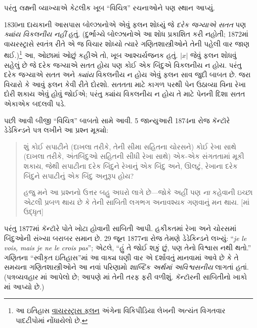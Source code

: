 \documentclass[../../../include/open-logic-section]{subfiles}
\begin{document}

પરંતુ \emph{લક્ષ}ની વ્યાખ્યાએ કેટલીક ખૂબ
“વિચિત્ર” રચનાઓને પણ સ્થાન આપ્યું.

1830ના દાયકાની આસપાસ બોલ્ઝાનોએ એવું
ફલન શોધ્યું જે \emph{દરેક જગ્યાએ સતત}
પણ \emph{ક્યાંય વિકલનીય નહીં} હતું.
(દુર્ભાગ્યે બોલ્ઝાનોએ આ શોધ પ્રકાશિત
કરી નહોતી; 1872માં વાયરસ્ટ્રાસે સ્વતંત્ર
રીતે એ જ વિચાર શોધ્યો ત્યારે ગણિતશાસ્ત્રીઓને
તેની પહેલી વાર જાણ થઈ.)\footnote{આ ઇતિહાસ
\href{http://en.wikipedia.org/wiki/Weierstrass_function}{વાયરસ્ટ્રાસ
ફલન} અંગેના વિકિપીડિયા લેખની અત્યંત
વિગતવાર પાદટીપોમાં નોંધાયેલો છે.}
આ, ઓછામાં ઓછું કહીએ તો, ખૂબ આશ્ચર્યજનક
હતું. $|x|$ જેવું ફલન શોધવું સહેલું છે
જે દરેક જગ્યાએ સતત હોય પણ કોઈ એક
બિંદુએ વિકલનીય ન હોય. પરંતુ દરેક
જગ્યાએ સતત અને \emph{ક્યાંય}
વિકલનીય ન હોય એવું ફલન સાવ
જુદી બાબત છે. જરા વિચારો કે
આવું ફલન કેવી રીતે દોરશો.
સતતતા માટે કાગળ પરથી પેન
ઉઠાવ્યા વિના રેખા દોરી શકાય
એવું હોવું જોઈએ; પરંતુ ક્યાંય
વિકલનીય ન હોય તે માટે પેનની
દિશા સતત એકાએક બદલવી પડે.

પછી આવી બીજી “વિચિત્ર” બાબતો સામે આવી.
5 જાન્યુઆરી 1874ના રોજ કૅન્ટૉરે
ડેડેકિન્ડને પત્ર લખીને આ પ્રશ્ન મૂક્યો:
\begin{quote}
શું કોઈ સપાટીને (દાખલા તરીકે, તેની સીમા
સહિતના ચોરસને) કોઈ રેખા સાથે
(દાખલા તરીકે, અંતબિંદુઓ સહિતની
સીધી રેખા સાથે) એક-એક સંગતતામાં
મૂકી શકાય, જેથી સપાટીના દરેક
બિંદુને રેખાનું એક બિંદુ અને,
ઊલટું, રેખાના દરેક બિંદુને
સપાટીનું એક બિંદુ અનુરૂપ હોય?

હજુ મને આ પ્રશ્નનો ઉત્તર બહુ અઘરો લાગે
છે—જોકે અહીં પણ \emph{ના} કહેવાની
ઇચ્છા એટલી પ્રબળ થાય છે કે તેની
સાબિતી લગભગ અનાવશ્યક ગણવાનું
મન થાય. [\citealt{Gouvea2011}માં
ઉદ્ધૃત]
\end{quote}
પરંતુ 1877માં કૅન્ટૉરે પોતે ખોટા
હોવાની સાબિતી આપી. હકીકતમાં
રેખા અને ચોરસમાં બિંદુઓની
સંખ્યા બરાબર સમાન છે.
29 જૂન 1877ના રોજ તેમણે
ડેડેકિન્ડને લખ્યું:
“\emph{je le vois, mais je ne le crois pas}”;
એટલે, “હું તે જોઈ શકું છું,
પણ તેનો વિશ્વાસ નથી થતો.”
ગણિતના “સ્વીકૃત ઇતિહાસ”માં
આ વાક્ય ઘણી વાર એ દર્શાવતું
માનવામાં આવે છે કે તે સમયના
ગણિતશાસ્ત્રીઓને આ નવાં
પરિણામો \emph{શાબ્દિક અર્થમાં
અવિશ્વસનીય} લાગતાં હતાં.
(પત્રવ્યવહાર \citet{Gouvea2011}માં
આપેલો છે; આપણે
માં
તેની તરફ ફરી વળીશું.
કૅન્ટૉરની સાબિતીનો
ખાકો માં
આપ્યો છે.)
\end{document}
